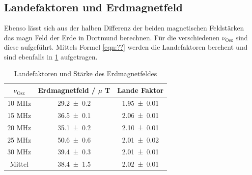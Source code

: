 \subsection{Landefaktoren und Erdmagnetfeld}
Ebenso lässt sich aus der halben Differenz der beiden magnetischen Feldstärken das magn Feld der Erde in Dortmund berechnen. Für die verschiedenen $\nu_\text{Osz}$ sind diese aufgeführt.
Mittels Formel \ref{eqn:??} werden die Landefaktoren berchent und sind ebenfalls in \ref{tab:lande} aufgetragen.
\begin{table}
  \centering
  \caption{Landefaktoren und Stärke des Erdmagnetfeldes}
  \begin{tabular}{c|c c}
    \toprule
    	$\nu_\text{Osz}$ & Erdmagnetfeld / $\mu$ T & Lande Faktor \\
    \midrule
       	10 MHz & \num{29.2 +- 0.2} & \num{1.95 +- 0.01} \\
	15 MHz & \num{36.5 +- 0.1} & \num{2.06 +- 0.01} \\ 
	20 MHz & \num{35.1 +- 0.2} & \num{2.10 +- 0.01} \\
	25 MHz & \num{50.6 +- 0.6} & \num{2.01 +- 0.02} \\
	30 MHz & \num{39.4 +- 0.3} & \num{2.01 +- 0.01} \\
    \midrule
	Mittel & \num{38.4 +- 1.5} & \num{2.02 +- 0.01} \\
    \bottomrule
  \end{tabular}
  \label{tab:lande}
\end{table}

